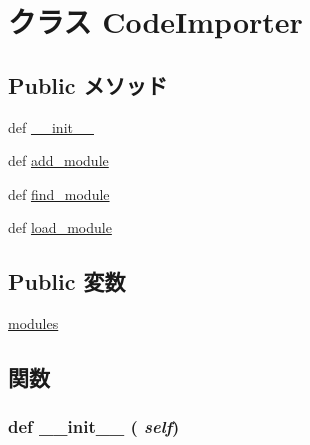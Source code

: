 \hypertarget{classimporter_1_1CodeImporter}{
\section{クラス CodeImporter}
\label{classimporter_1_1CodeImporter}
}
\subsection*{Public メソッド}
\begin{DoxyCompactItemize}
\item 
def \hyperlink{classimporter_1_1CodeImporter_ac775ee34451fdfa742b318538164070e}{\_\-\_\-init\_\-\_\-}
\item 
def \hyperlink{classimporter_1_1CodeImporter_ad22d65f9dea83524b07e886e4201cec3}{add\_\-module}
\item 
def \hyperlink{classimporter_1_1CodeImporter_aa4d132840fb72dbe7fb6a9196a6649bf}{find\_\-module}
\item 
def \hyperlink{classimporter_1_1CodeImporter_a89668954a89cab781fc0af952e937dc4}{load\_\-module}
\end{DoxyCompactItemize}
\subsection*{Public 変数}
\begin{DoxyCompactItemize}
\item 
\hyperlink{classimporter_1_1CodeImporter_a7f721a262dd3d84c38ad13e9af027464}{modules}
\end{DoxyCompactItemize}


\subsection{関数}
\hypertarget{classimporter_1_1CodeImporter_ac775ee34451fdfa742b318538164070e}{
\subsubsection[{\_\-\_\-init\_\-\_\-}]{\setlength{\rightskip}{0pt plus 5cm}def \_\-\_\-init\_\-\_\- ( {\em self})}}
\label{classimporter_1_1CodeImporter_ac775ee34451fdfa742b318538164070e}



